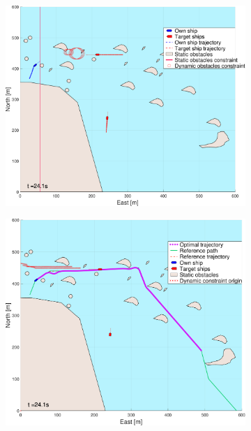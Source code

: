 \clearpage
\begin{figure}[!ht] %
    \begin{subfigure}[b]{0.494\textwidth}
        \centering
        \includegraphics[width=\textwidth]{Images/NewFigures/skjergard_m_trafikk_NEW/_Simple_0fig1_time=25}
        \subcaption{}
    \end{subfigure}
    \hfill
    \begin{subfigure}[b]{0.494\textwidth}
        \centering
        \includegraphics[width=\textwidth]{Images/NewFigures/skjergard_m_trafikk_NEW/_Simple_0fig999_time=25}

\end{subfigure}
\end{figure}
